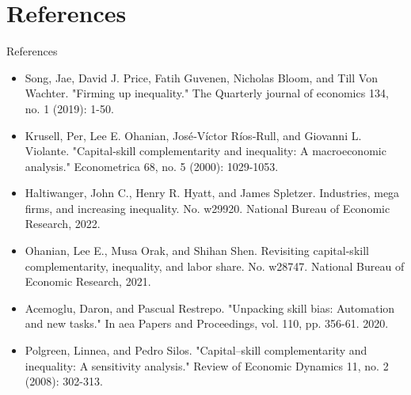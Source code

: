 \documentclass[notes,11pt, aspectratio=169]{beamer}
\newenvironment{wideitemize}{\itemize\addtolength{\itemsep}{10pt}}{\enditemize}
\begin{document}
\section*{References}
\begin{frame}{References}
 \begin{itemize}
 \item Song, Jae, David J. Price, Fatih Guvenen, Nicholas Bloom, and Till Von Wachter. "Firming up inequality." The Quarterly journal of economics 134, no. 1 (2019): 1-50.
 \item Krusell, Per, Lee E. Ohanian, José‐Víctor Ríos‐Rull, and Giovanni L. Violante. "Capital‐skill complementarity and inequality: A macroeconomic analysis." Econometrica 68, no. 5 (2000): 1029-1053.
 \item Haltiwanger, John C., Henry R. Hyatt, and James Spletzer. Industries, mega firms, and increasing inequality. No. w29920. National Bureau of Economic Research, 2022.
 \item Ohanian, Lee E., Musa Orak, and Shihan Shen. Revisiting capital-skill complementarity, inequality, and labor share. No. w28747. National Bureau of Economic Research, 2021.
 \item Acemoglu, Daron, and Pascual Restrepo. "Unpacking skill bias: Automation and new tasks." In aea Papers and Proceedings, vol. 110, pp. 356-61. 2020.
 \item Polgreen, Linnea, and Pedro Silos. "Capital–skill complementarity and inequality: A sensitivity analysis." Review of Economic Dynamics 11, no. 2 (2008): 302-313.
 \end{itemize}
\end{frame}


\end{document}
